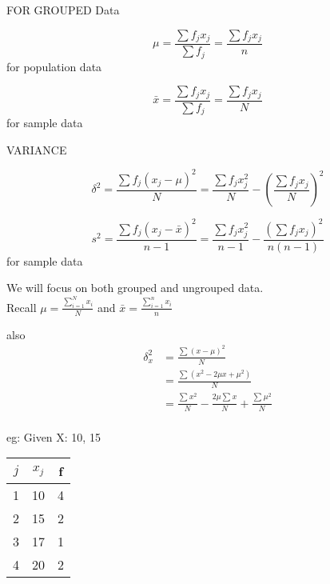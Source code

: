 FOR GROUPED Data

\begin{equation*}
    \mu = \frac{\sum f_j x_j}{\sum f_j}  = \frac{\sum f_j x_j}{n}
\end{equation*}
for population data


\begin{equation*}
    \bar{x} = \frac{\sum f_j x_j}{\sum f_j}  = \frac{\sum f_j x_j}{N}
\end{equation*}
for sample data


VARIANCE

\begin{equation*}
    \delta^2 = \frac{\sum f_j(x_j - \mu)^2}{N} = \frac{\sum f_j x_j^2}{N} - (\frac{\sum f_jx_j}{N})^2
\end{equation*}

\begin{equation*}
    s^2 = \frac{\sum f_j(x_j - \bar{x})^2}{n-1} = \frac{\sum f_j x_j^2}{n-1} - \frac{(\sum f_jx_j)^2}{n(n-1)}
\end{equation*}
for sample data



We will focus on both grouped and ungrouped data. \\
Recall $\mu = \frac{\sum_{i = 1}^{N}x_i}{N}$ and $\bar{x} = \frac{\sum_{i = 1}^{n}x_i}{n}$

also
\begin{align*}
    \delta_x^2 & = \frac{\sum_{}^{}(x - \mu)^2}{N}                                                 \\
               & = \frac{\sum_{}^{}(x^2 - 2\mu x + \mu^2)}{N}                                      \\
               & = \frac{\sum_{}^{}x^2}{N} - \frac{2\mu\sum_{}^{}x}{N} + \frac{\sum_{}^{}\mu^2}{N} \\
\end{align*}






eg: Given X: 10, 15
\begin{table}[H]
    \centering
    \begin{tabular}{|c|c|c|}
        \hline $j$ & $x_j$ & f \\
        \hline 1   & 10    & 4 \\
        \hline 2   & 15    & 2 \\
        \hline 3   & 17    & 1 \\
        \hline 4   & 20    & 2 \\
        \hline
    \end{tabular}
\end{table}

